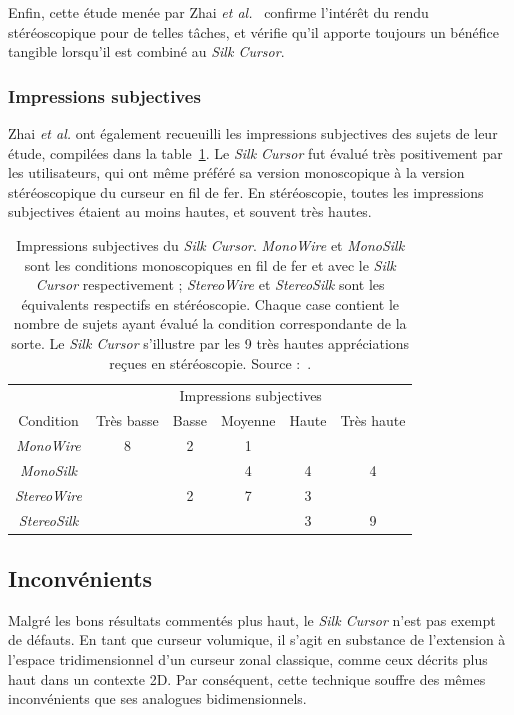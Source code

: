 	Enfin, cette étude menée par Zhai \emph{et al.}~\cite{zhai1994silk} confirme l'intérêt du rendu stéréoscopique pour de telles tâches, et vérifie qu'il apporte toujours un bénéfice tangible lorsqu'il est combiné au \emph{Silk Cursor}.
	
	\subsubsection{Impressions subjectives}
	Zhai \emph{et al.} ont également recueuilli les impressions subjectives des sujets de leur étude, compilées dans la table~\ref{tab:silkImpr}. Le \emph{Silk Cursor} fut évalué très positivement par les utilisateurs, qui ont même préféré sa version monoscopique à la version stéréoscopique du curseur en fil de fer. En stéréoscopie, toutes les impressions subjectives étaient au moins hautes, et souvent très hautes.

	\begin{table}
	\centering
	\begin{tabular}{c | c c c c c}
							& \multicolumn{5}{c}{Impressions subjectives} \\
		Condition			& Très basse	& Basse	& Moyenne	& Haute	& Très haute \bigstrut[b] \\ \hline
		\emph{MonoWire}		& 8				& 2		& 1			&		& \bigstrut[t]	\\
		\emph{MonoSilk}		& 				& 		& 4			& 4		& 4 			\\
		\emph{StereoWire}	& 				& 2		& 7			& 3		& 	 			\\
		\emph{StereoSilk}	& 				& 		& 			& 3		& 9 			\\
	\end{tabular}
	\caption[\emph{Silk Cursor} -- impressions subjectives]{Impressions subjectives du \emph{Silk Cursor}. \emph{MonoWire} et \emph{MonoSilk} sont les conditions monoscopiques en fil de fer et avec le \emph{Silk Cursor} respectivement ; \emph{StereoWire} et \emph{StereoSilk} sont les équivalents respectifs en stéréoscopie. Chaque case contient le nombre de sujets ayant évalué la condition correspondante de la sorte. Le \emph{Silk Cursor} s'illustre par les 9 très hautes appréciations reçues en stéréoscopie. Source :~\cite{zhai1994silk}.}
	\label{tab:silkImpr}
	\end{table}
	
	\subsection{Inconvénients}
	Malgré les bons résultats commentés plus haut, le \emph{Silk Cursor} n'est pas exempt de défauts. En tant que curseur volumique, il s'agit en substance de l'extension à l'espace tridimensionnel d'un curseur zonal classique, comme ceux décrits plus haut dans un contexte 2D. Par conséquent, cette technique souffre des mêmes inconvénients que ses analogues bidimensionnels.
	
